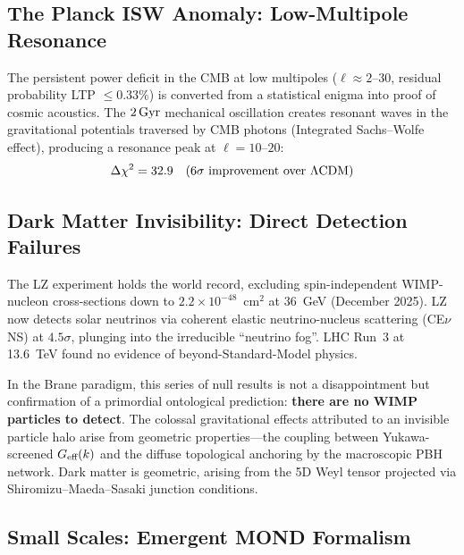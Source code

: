 \subsection{The Planck ISW Anomaly: Low-Multipole Resonance}
\label{sec:isw_anomaly}

The persistent power deficit in the CMB at low multipoles ($\ell \approx 2$--$30$, residual probability LTP $\le 0.33\%$) is converted from a statistical enigma into proof of cosmic acoustics. The $2\,\text{Gyr}$ mechanical oscillation creates resonant waves in the gravitational potentials traversed by CMB photons (Integrated Sachs--Wolfe effect), producing a resonance peak at $\ell = 10$--$20$:
\begin{equation}
\Delta\chi^2 = 32.9 \quad (6\sigma \text{ improvement over $\Lambda$CDM})
\end{equation}

\subsection{Dark Matter Invisibility: Direct Detection Failures}
\label{sec:dm_invisibility}

The LZ experiment holds the world record, excluding spin-independent WIMP-nucleon cross-sections down to $2.2 \times 10^{-48}$~cm$^2$ at 36~GeV (December 2025). LZ now detects solar neutrinos via coherent elastic neutrino-nucleus scattering (CE$\nu$NS) at $4.5\sigma$, plunging into the irreducible ``neutrino fog''. LHC Run~3 at 13.6~TeV found no evidence of beyond-Standard-Model physics.

In the Brane paradigm, this series of null results is not a disappointment but confirmation of a primordial ontological prediction: \textbf{there are no WIMP particles to detect}. The colossal gravitational effects attributed to an invisible particle halo arise from geometric properties---the coupling between Yukawa-screened $G_\text{eff}(k)$ and the diffuse topological anchoring by the macroscopic PBH network. Dark matter is geometric, arising from the 5D Weyl tensor projected via Shiromizu--Maeda--Sasaki junction conditions.

\subsection{Small Scales: Emergent MOND Formalism}
\label{sec:emergent_mond}


